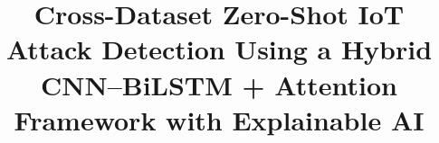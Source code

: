 \documentclass[a4paper,fleqn]{cas-sc}
\begin{document}
\let\WriteBookmarks\relax
\def\floatpagepagefraction{0.5}
\def\textpagefraction{.1}
\renewcommand{\topfraction}{.85}
\renewcommand{\bottomfraction}{.7}
\renewcommand{\textfraction}{.15}
\renewcommand{\floatpagefraction}{.66}
\renewcommand{\dbltopfraction}{.85}
\renewcommand{\dblfloatpagefraction}{.66}
\setcounter{topnumber}{9}
\setcounter{bottomnumber}{9}
\setcounter{totalnumber}{20}
\setcounter{dbltopnumber}{9}



\title [mode = title]{Cross-Dataset Zero-Shot {IoT} Attack Detection Using a Hybrid {{\color{blue}CNN--BiLSTM + Attention}} Framework with Explainable {AI}}  



%







\end{document}
